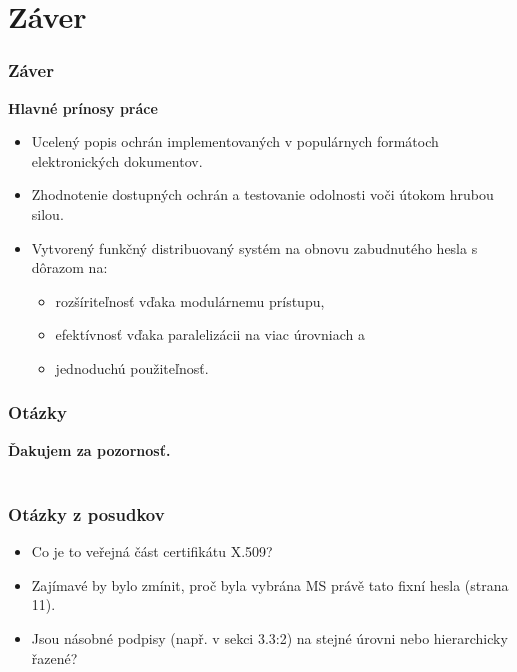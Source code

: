 \documentclass[xcolor=dvipsnames]{beamer}
\def\itemtitle#1{{\bfseries#1\smallskip}}
\begin{document}
\section{Záver}
\begin{frame}
	\frametitle{Záver}

	\itemtitle{Hlavné prínosy práce}
	\begin{itemize}
		\item Ucelený popis ochrán implementovaných v populárnych formátoch elektronických dokumentov.
		\item Zhodnotenie dostupných ochrán a testovanie odolnosti voči útokom hrubou silou. 
		\item Vytvorený funkčný distribuovaný systém na obnovu zabudnutého hesla s dôrazom na:
		\begin{itemize}
			\item rozšíriteľnosť vďaka modulárnemu prístupu,
			\item efektívnosť vďaka paralelizácii na viac úrovniach a
			\item jednoduchú použiteľnosť.
		\end{itemize}
	\end{itemize}
\end{frame}


\begin{frame}
   \frametitle{Otázky}
 	\vspace*{\fill}

 	\begin{center} 		
 		\huge\bfseries{} Ďakujem za pozornosť.\\~\\
 	\end{center}
 	\vspace*{\fill}
 \end{frame}


\begin{frame}
	\frametitle{Otázky z posudkov}
	\begin{itemize}
		\item Co je to veřejná část certifikátu X.509?
		\item Zajímavé by bylo zmínit, proč byla vybrána MS právě tato fixní hesla (strana 11).
		\item Jsou násobné podpisy (např. v sekci 3.3:2) na stejné úrovni nebo hierarchicky řazené?
	\end{itemize}
\end{frame}
\end{document}
